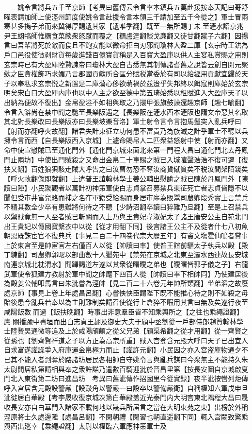 　　姚令言將兵五千至京師【考異曰舊傳云令言率本鎮兵五萬赴援按奉天記曰哥舒曜表請加師上使涇州節度使姚令言赴援令言本領三千請加至五千今從之】軍士冒雨寒甚多擕子弟而來冀得厚賜遺其家【遺唯季翻】既至一無所賜丁未至滻水詔京兆尹王翃犒師惟糲食菜餤衆怒蹴而覆之【糲盧逹翻餤戈亷翻又徒甘翻蹴子六翻】因揚言曰吾輩將死於敵而食且不飽安能以微命拒白刃邪聞瓊林大盈二庫【玄宗時王鉷為戶口邑役使徵剥財貨每歲進錢百億寶貨稱是入百寶大盈庫以供人主宴私賞賜之用則玄宗時已有大盈庫陸贄諫帝曰瓊林大盈自古悉無其制傳諸耆舊之說皆云創自開元聚歛之臣貪權飾巧求媚乃言郡國貢獻所合區分賦税當委於有司以給經用貢獻宜歸於天子以奉私求玄宗悦之新置是二庫蕩心侈欲萌禍於兹迨乎失邦終以餌寇則庫始於玄宗明矣宋白曰大盈庫内庫也以中人主之欲至德中第五琦始悉以租賦進入大盈庫天子以出納為便故不復出】金帛盈溢不如相與取之乃擐甲張旗鼓譟還趣京師【趣七喻翻】令言入辭尚在禁中聞之馳至長樂阪遇之【長樂阪在滻水西本滻阪也隋文帝惡其名取其北對長樂改曰長樂阪亦曰長樂坡樂音洛】軍士射令言令言抱馬鬛突入亂兵呼曰【射而亦翻呼火故翻】諸君失計東征立功何患不富貴乃為族滅之計乎軍士不聽以兵擁令言而西【自長樂阪西入京城】上遽命賜帛人二匹衆益怒射中使【射而亦翻】又命中使宣慰賊已至通化門外【通化門京城東面北來第一門程大昌曰通化門北去丹鳳門止兩坊】中使出門賊殺之又命出金帛二十車賜之賊已入城喧聲浩浩不復可遏【復扶又翻】百姓狼狽駭走賊大呼告之曰汝曹勿恐不奪汝商貨僦質矣不税汝間架陌錢矣【呼火故翻僦即就翻】上遣普王誼翰林學士姜公輔出慰諭之賊已陳於丹鳳門外【陳讀曰陣】小民聚觀者以萬計初神策軍使白志貞掌召募禁兵東征死亡者志貞皆隱不以聞但受市井富兒賂而補之名在軍籍受給賜而身居市廛為販鬻司農卿段秀實上言禁兵不精其數全少卒有患難將何待之不聽【少詩沼翻卒讀曰猝難乃旦翻】至是上召禁兵以禦賊竟無一人至者賊已斬關而入上乃與王貴妃韋淑妃太子諸王唐安公主自苑北門出王貴妃以傳國寶繫衣中以從【從才用翻下同】後宫諸王公主不及從者什七八初魚朝恩既誅宦官不復典兵【事見二百二十四卷代宗大歷五年】有竇文塲霍仙鳴者嘗事上於東宫至是帥宦官左右僅百人以從【帥讀曰率】使普王誼前驅太子執兵以殿【殿丁練翻】司農卿郭曙以部曲數十人獵苑中【禁苑在京城之北東至灞水西連故長安城南連京城北枕渭水】聞蹕謁道左遂以其衆從曙曖之弟也【曖曙皆郭子儀之子】右龍武軍使令狐建方教射於軍中聞之帥麾下四百人從【帥讀曰率下相帥同】乃使建居後為殿姜公輔叩馬言曰朱泚嘗為涇帥【見二百二十六卷元年帥所類翻】坐弟滔之故廢處京師【事見上卷上年處昌呂翻】心嘗怏怏臣謂陛下既不能推心待之則不如殺之毋貽後患今亂兵若奉以為主則難制矣請召使從行上倉猝不暇用其言曰無及矣遂行夜至咸陽飯數而過【飯扶晩翻】時事出非意羣臣皆不知乘輿所之【之往也乘繩證翻】盧關播踰中書垣而出白志貞王翃及御史大夫于頎中丞劉從一戶部侍郎趙贊翰林學士陸贄吴通微等追及上於咸陽頎頔之從父兄弟【頎渠希翻之從才用翻】從一齊賢之從孫也【劉齊賢祥道之子以方正為高宗所重】賊入宫登含元殿大呼曰天子已出宜人自求富遂讙譟爭入府庫運金帛極力而止【讙許元翻】小民因之亦入宫盗庫物通夕不已其不能入者剽奪於路諸坊居民各相帥自守姚令言與亂兵謀曰今衆無主不能持久朱太尉閒居私第請相與奉之衆許諾乃遣數百騎迎泚於晉昌里第【按長安圖自京城啟夏門北入東街第二坊曰進昌坊　考異曰舊泚傳作招國里今從實録】夜半泚按轡列炬傳呼入宫居含元殿設警嚴【設鼓角以警嚴一曰設卒以警備嚴衛】自稱權知六軍戊申旦泚徙居白華殿【考李晟收復京城次第白華殿盖近光泰門内大明宫東北隅程大昌曰晟收長安亦自白華門入諸家不載何地以晟兵所届言之當在大明東苑之東】出榜於外稱涇原將士久處邊陲【處昌呂翻】不閑朝禮【閑習也朝直遥翻下同】輒入宫闕致驚乘輿西出廵幸【乘繩證翻】太尉以權臨六軍應神策軍士及